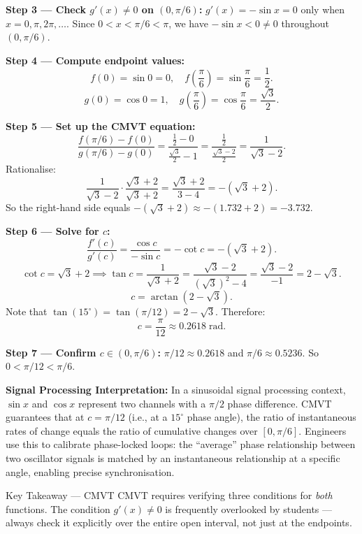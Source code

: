\documentclass[12pt,a4paper]{article}
\begin{document}
\textbf{Step 3 --- Check $g'(x) \neq 0$ on $(0, \pi/6)$:}
$g'(x) = -\sin x = 0$ only when $x = 0, \pi, 2\pi, \ldots$. Since $0 < x < \pi/6 < \pi$,
we have $-\sin x < 0 \neq 0$ throughout $(0, \pi/6)$. \checkmark

\textbf{Step 4 --- Compute endpoint values:}
\[
  f(0) = \sin 0 = 0, \quad f\!\left(\frac{\pi}{6}\right) = \sin\frac{\pi}{6} = \frac{1}{2}.
\]
\[
  g(0) = \cos 0 = 1, \quad g\!\left(\frac{\pi}{6}\right) = \cos\frac{\pi}{6} = \frac{\sqrt{3}}{2}.
\]

\textbf{Step 5 --- Set up the CMVT equation:}
\[
  \frac{f(\pi/6) - f(0)}{g(\pi/6) - g(0)} = \frac{\tfrac{1}{2} - 0}{\tfrac{\sqrt{3}}{2} - 1}
  = \frac{\tfrac{1}{2}}{\tfrac{\sqrt{3}-2}{2}} = \frac{1}{\sqrt{3}-2}.
\]
Rationalise:
\[
  \frac{1}{\sqrt{3}-2} \cdot \frac{\sqrt{3}+2}{\sqrt{3}+2} = \frac{\sqrt{3}+2}{3-4} = -(\sqrt{3}+2).
\]
So the right-hand side equals $-(\sqrt{3}+2) \approx -(1.732+2) = -3.732$.

\textbf{Step 6 --- Solve for $c$:}
\[
  \frac{f'(c)}{g'(c)} = \frac{\cos c}{-\sin c} = -\cot c = -(\sqrt{3}+2).
\]
\[
  \cot c = \sqrt{3}+2 \implies \tan c = \frac{1}{\sqrt{3}+2} = \frac{\sqrt{3}-2}{(\sqrt{3})^2-4} = \frac{\sqrt{3}-2}{-1} = 2-\sqrt{3}.
\]
\[
  c = \arctan(2 - \sqrt{3}).
\]
Note that $\tan(15^\circ) = \tan(\pi/12) = 2 - \sqrt{3}$. Therefore:
\[
  c = \frac{\pi}{12} \approx 0.2618 \;\text{rad}.
\]

\textbf{Step 7 --- Confirm $c \in (0, \pi/6)$:}
$\pi/12 \approx 0.2618$ and $\pi/6 \approx 0.5236$. So $0 < \pi/12 < \pi/6$. \checkmark

\textbf{Signal Processing Interpretation:}
In a sinusoidal signal processing context, $\sin x$ and $\cos x$ represent two channels
with a $\pi/2$ phase difference. CMVT guarantees that at $c = \pi/12$ (i.e., at a
$15^\circ$ phase angle), the ratio of instantaneous rates of change equals the ratio of
cumulative changes over $[0, \pi/6]$. Engineers use this to calibrate phase-locked loops:
the ``average'' phase relationship between two oscillator signals is matched by an
instantaneous relationship at a specific angle, enabling precise synchronisation.

\begin{learnbox}{Key Takeaway --- CMVT}
CMVT requires verifying three conditions for \emph{both} functions. The condition
$g'(x) \neq 0$ is frequently overlooked by students --- always check it explicitly
over the entire open interval, not just at the endpoints.
\end{learnbox}
\end{document}
